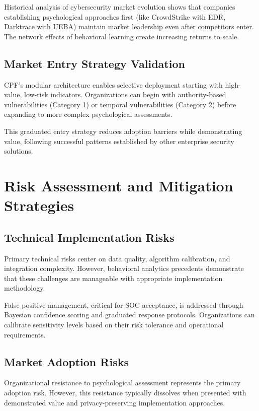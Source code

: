 \documentclass[11pt,a4paper]{article}
\begin{document}
Historical analysis of cybersecurity market evolution shows that companies establishing psychological approaches first (like CrowdStrike with EDR, Darktrace with UEBA) maintain market leadership even after competitors enter. The network effects of behavioral learning create increasing returns to scale.

\subsection{Market Entry Strategy Validation}

CPF's modular architecture enables selective deployment starting with high-value, low-risk indicators. Organizations can begin with authority-based vulnerabilities (Category 1) or temporal vulnerabilities (Category 2) before expanding to more complex psychological assessments.

This graduated entry strategy reduces adoption barriers while demonstrating value, following successful patterns established by other enterprise security solutions.

\section{Risk Assessment and Mitigation Strategies}

\subsection{Technical Implementation Risks}

Primary technical risks center on data quality, algorithm calibration, and integration complexity. However, behavioral analytics precedents demonstrate that these challenges are manageable with appropriate implementation methodology.

False positive management, critical for SOC acceptance, is addressed through Bayesian confidence scoring and graduated response protocols. Organizations can calibrate sensitivity levels based on their risk tolerance and operational requirements.

\subsection{Market Adoption Risks}

Organizational resistance to psychological assessment represents the primary adoption risk. However, this resistance typically dissolves when presented with demonstrated value and privacy-preserving implementation approaches.
\end{document}
